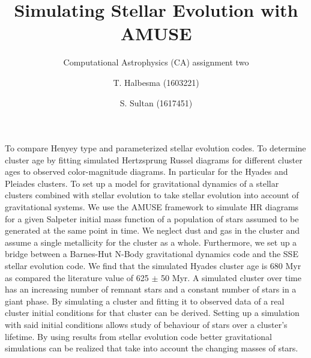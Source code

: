 \documentclass{aa}
\begin{document}
   \title{Simulating Stellar Evolution with AMUSE}

   \subtitle{Computational Astrophysics (CA) assignment two}

   \author{T. Halbesma (1603221)
          \and
          S. Sultan (1617451)
          }




  \abstract
   {}
   {To compare Henyey type and parameterized stellar evolution codes. To determine cluster age by fitting simulated Hertzsprung Russel diagrams for different cluster ages to observed color-magnitude diagrams. In particular for the Hyades and Pleiades clusters. To set up a model for gravitational dynamics of a stellar clusters combined with stellar evolution to take stellar evolution into account of gravitational systems.}
   {We use the AMUSE framework to simulate HR diagrams for a given Salpeter initial mass function of a population of stars assumed to be generated at the same point in time. We neglect dust and gas in the cluster and assume a single metallicity for the cluster as a whole. Furthermore, we set up a bridge between a Barnes-Hut N-Body gravitational dynamics code and the SSE stellar evolution code.}
   {We find that the simulated Hyades cluster age is 680 Myr as compared the literature value of 625 $\pm$ 50 Myr. A simulated cluster over time has an increasing number of remnant stars and a constant number of stars in a giant phase.}
   {By simulating a cluster and fitting it to observed data of a real cluster initial conditions for that cluster can be derived. Setting up a simulation with said initial conditions allows study of behaviour of stars over a cluster's lifetime. By using results from stellar evolution code better gravitational simulations can be realized that take into account the changing masses of stars.}
\end{document}
